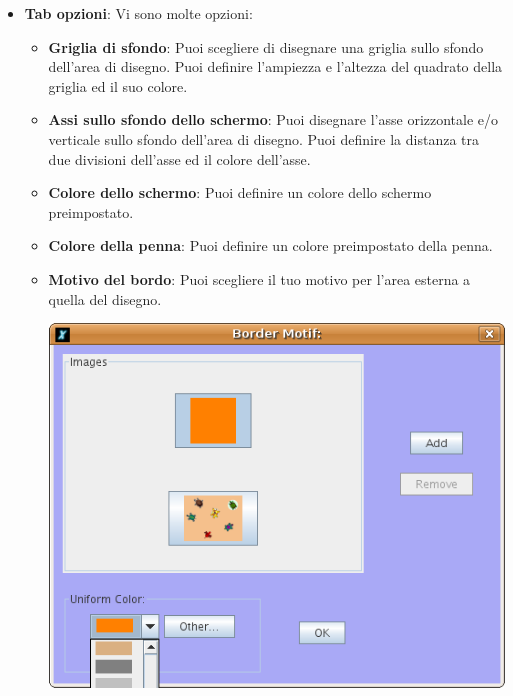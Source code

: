 \begin{itemize}
\begin{itemize}
\begin{center}
			\end{center}
			\vspace{0.25cm}
			\item \textbf{Tab opzioni}: Vi sono molte opzioni:
			\begin{itemize}
				\item \textbf{Griglia di sfondo}: Puoi scegliere di disegnare una griglia sullo sfondo dell'area di disegno. Puoi definire l'ampiezza e l'altezza del quadrato della griglia ed il suo colore.
				\item \textbf{Assi sullo sfondo dello schermo}: Puoi disegnare l'asse orizzontale e/o verticale sullo sfondo dell'area di disegno. Puoi definire la distanza tra due divisioni dell'asse ed il colore dell'asse.
				\item \textbf{Colore dello schermo}: Puoi definire un colore dello schermo preimpostato.
				\item \textbf{Colore della penna}: Puoi definire un colore preimpostato della penna.
				\item \textbf{Motivo del bordo}: Puoi scegliere il tuo motivo per l'area esterna a quella del disegno.
				\begin{center}
					\includegraphics[scale=0.4]{pics/interface-CaptureBorder.png}
				\end{center}

\end{itemize}
\end{itemize}
\end{itemize}
